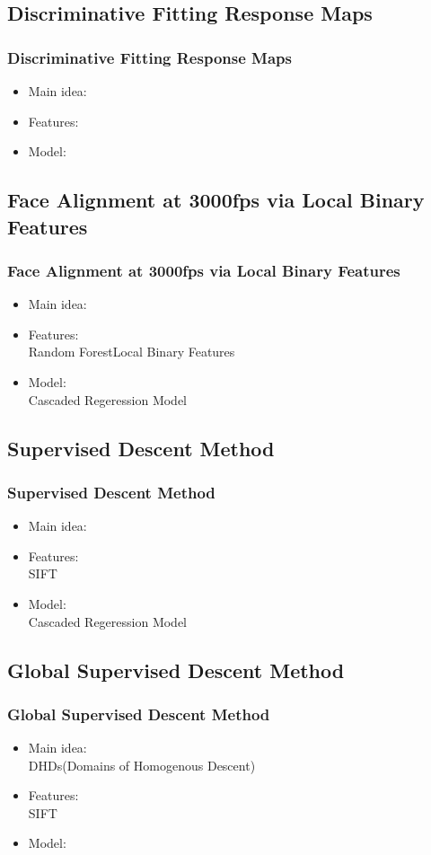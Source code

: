 \documentclass[mathserif]{beamer}%
\begin{document}
\subsection{Discriminative Fitting Response Maps}
\begin{frame}%
\frametitle{Discriminative Fitting Response Maps}
\begin{itemize}
    \item Main idea:\\
    \item Features:\\
    \item Model:\\
\end{itemize}
\end{frame}
%
\subsection{Face Alignment at 3000fps via Local Binary Features}
\begin{frame}%
  \frametitle{Face Alignment at 3000fps via Local Binary Features}
  \begin{itemize}
  \item Main idea:\\
  \item Features:\\%
    Random ForestLocal Binary Features%
  \item Model:\\
    Cascaded Regeression Model
  \end{itemize}
\end{frame}
%
\subsection{Supervised Descent Method}
\label{subsec:SDM}
\begin{frame}%
\frametitle{Supervised Descent Method}
\begin{itemize}
    \item Main idea:\\
    \item Features:\\
      SIFT
    \item Model:\\
      Cascaded Regeression Model
\end{itemize}
\end{frame}
%
\subsection{Global Supervised Descent Method}
\begin{frame}%
\frametitle{Global Supervised Descent Method}
\begin{itemize}
    \item Main idea:\\
      DHDs(Domains of Homogenous Descent)
    \item Features:\\
      SIFT
    \item Model:\\
\end{itemize}
\end{frame}
%
\end{document}
